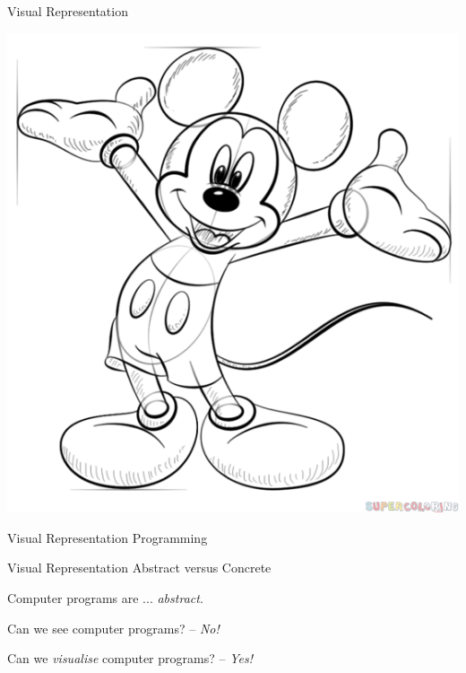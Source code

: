\documentclass{beamer}
\newcommand{\myheader}[1]{
	{\color{darkblue}
		\begin{Large}
			\begin{center}
				{#1}
			\end{center}
		\end{Large}
	}
}
\begin{document}
\begin{frame}[fragile]{Visual Representation}

\begin{center}
\includegraphics[height=0.8\textheight]{images/mickey2.png}
\end{center}
\end{frame}

\begin{frame}[fragile]{Visual Representation}
{Programming}
\pause
\begin{center}
\resizebox{!}{0.6\textheight}{\color{Red}{?}}
\end{center}
\end{frame}


\begin{frame}[fragile]{Visual Representation}
{Abstract versus Concrete}
\pause
\myheader{Computer programs are ... \pause \emph{abstract}.}
\pause
\myheader{Can we see computer programs? -- \pause \emph{\color{Red}No!}}
\pause
\myheader{Can we \emph{visualise} computer programs? -- \pause \emph{\color{Red}Yes!}}

\end{frame}
\end{document}
